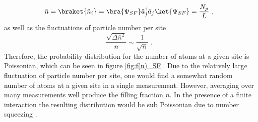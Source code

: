 \begin{equation}
	\bar{n} = \braket{\hat{n}_i} = \bra{\Psi_{SF}} \hat{a}_{j}^{\dag} \hat{a}_{j} \ket{\Psi_{SF}} = \frac{N_p}{L} \; ,
\end{equation}
as well as the fluctuations of particle number per site
\begin{equation}
	\frac{\sqrt{\Delta \bar{n}^2}}{\bar{n}} \sim \frac{1}{\sqrt{\bar{n}}} \; .
\end{equation}
Therefore, the probability distribution for the number of atoms at a given site is Poissonian, which can be seen in figure \ref{fig:f(n)_SF}. Due to the relatively large fluctuation of particle number per site, one would find a somewhat random number of atoms at a given site in a single measurement. However, averaging over many measurements well produce the filling fraction $\bar{n}$. In the presence of a finite interaction the resulting distribution would be sub Poissonian due to number squeezing \cite{greiner}.


